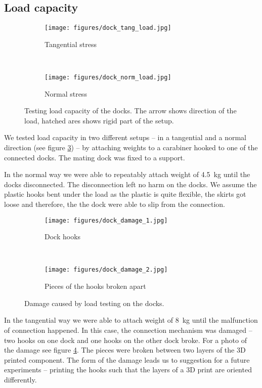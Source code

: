 \subsection{Load capacity}

\begin{figure}[t!]
    \centering
    \begin{subfigure}[b]{0.45\textwidth}
        \texttt{[image: figures/dock\_tang\_load.jpg]}
        \caption{Tangential stress}
        \label{fig:dock_test_tang}
    \end{subfigure}
    ~
    \begin{subfigure}[b]{0.45\textwidth}
        \texttt{[image: figures/dock\_norm\_load.jpg]}
        \caption{Normal stress}
        \label{fig:dock_test_norm}
    \end{subfigure}
    \caption{Testing load capacity of the docks. The arrow shows direction of
    the load, hatched ares shows rigid part of the setup.}
    \label{fig:dock_test_load}
\end{figure}

We tested load capacity in two different setups -- in a tangential and a normal
direction (see figure \ref{fig:dock_test_load}) -- by attaching weights to a
carabiner hooked to one of the connected docks. The mating dock was fixed to a
support.

In the normal way we were able to repeatably attach weight of 4.5~kg until the
docks disconnected. The disconnection left no harm on the docks. We assume the
plastic hooks bent under the load as the plastic is quite flexible, the skirts
got loose and therefore, the the dock were able to slip from the connection.

\begin{figure}[t!]
    \centering
    \begin{subfigure}[b]{0.45\textwidth}
        \texttt{[image: figures/dock\_damage\_1.jpg]}
        \caption{Dock hooks}
    \end{subfigure}
    ~
    \begin{subfigure}[b]{0.45\textwidth}
        \texttt{[image: figures/dock\_damage\_2.jpg]}
        \caption{Pieces of the hooks broken apart}
    \end{subfigure}
    \caption{Damage caused by load testing on the docks.}
    \label{fig:dock_damage}
\end{figure}

In the tangential way we were able to attach weight of 8~kg until the
malfunction of connection happened. In this case, the connection mechanism was
damaged -- two hooks on one dock and one hooks on the other dock broke. For a
photo of the damage see figure \ref{fig:dock_damage}. The pieces were broken
between two layers of the 3D printed component. The form of the damage leads us
to suggestion for a future experiments -- printing the hooks such that the
layers of a 3D print are oriented differently.


